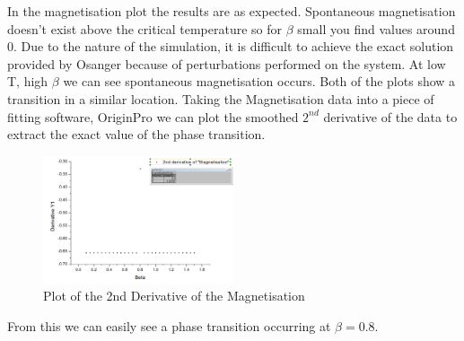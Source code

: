 \documentclass[10pt,a4paper]{article}
\begin{document}
In the magnetisation plot the results are as expected.
Spontaneous magnetisation doesn't exist above the critical temperature\cite{Montroll1963} so for $\beta$ small you find values around $0$.
Due to the nature of the simulation, it is difficult to achieve the exact solution provided by Osanger\cite{Montroll1963} because of perturbations performed on the system.
At low T, high $\beta$ we can see spontaneous magnetisation occurs.
Both of the plots show a transition in a similar location.
Taking the Magnetisation data into a piece of fitting software, OriginPro we can plot the smoothed $2^{nd}$ derivative of the data to extract the exact value of the phase transition.
\begin{figure}[H]
\centering
\includegraphics[width=0.5\textwidth]{2ndDerivativeMagnetisation.PNG}
\caption{Plot of the 2nd Derivative of the Magnetisation}
\end{figure}
From this we can easily see a phase transition occurring at $\beta = 0.8$.
\end{document}
